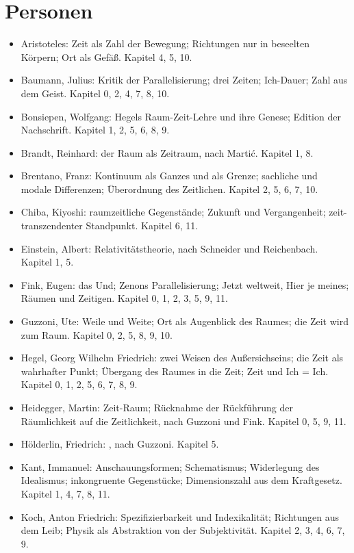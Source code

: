 \chapter{Personen}

\begin{itemize}
\item Aristoteles: Zeit als Zahl der Bewegung; Richtungen nur in beseelten Körpern; Ort als Gefäß. Kapitel 4, 5, 10.
\item Baumann, Julius: Kritik der Parallelisierung; drei Zeiten; Ich-Dauer; Zahl aus dem Geist. Kapitel 0, 2, 4, 7, 8, 10.
\item Bonsiepen, Wolfgang: Hegels Raum-Zeit-Lehre und ihre Genese; Edition der Nachschrift. Kapitel 1, 2, 5, 6, 8, 9.
\item Brandt, Reinhard: der Raum als Zeitraum, nach Martić. Kapitel 1, 8.
\item Brentano, Franz: Kontinuum als Ganzes und als Grenze; sachliche und modale Differenzen; Überordnung des Zeitlichen. Kapitel 2, 5, 6, 7, 10.
\item Chiba, Kiyoshi: raumzeitliche Gegenstände; Zukunft und Vergangenheit; zeit-transzendenter Standpunkt. Kapitel 6, 11.
\item Einstein, Albert: Relativitätstheorie, nach Schneider und Reichenbach. Kapitel 1, 5.
\item Fink, Eugen: das Und; Zenons Parallelisierung; Jetzt weltweit, Hier je meines; Räumen und Zeitigen. Kapitel 0, 1, 2, 3, 5, 9, 11.
\item Guzzoni, Ute: Weile und Weite; Ort als Augenblick des Raumes; die Zeit wird zum Raum. Kapitel 0, 2, 5, 8, 9, 10.
\item Hegel, Georg Wilhelm Friedrich: zwei Weisen des Außersichseins; die Zeit als wahrhafter Punkt; Übergang des Raumes in die Zeit; Zeit und Ich = Ich. Kapitel 0, 1, 2, 5, 6, 7, 8, 9.
\item Heidegger, Martin: Zeit-Raum; Rücknahme der Rückführung der Räumlichkeit auf die Zeitlichkeit, nach Guzzoni und Fink. Kapitel 0, 5, 9, 11.
\item Hölderlin, Friedrich: , nach Guzzoni. Kapitel 5.
\item Kant, Immanuel: Anschauungsformen; Schematismus; Widerlegung des Idealismus; inkongruente Gegenstücke; Dimensionszahl aus dem Kraftgesetz. Kapitel 1, 4, 7, 8, 11.
\item Koch, Anton Friedrich: Spezifizierbarkeit und Indexikalität; Richtungen aus dem Leib; Physik als Abstraktion von der Subjektivität. Kapitel 2, 3, 4, 6, 7, 9.

\end{itemize}
